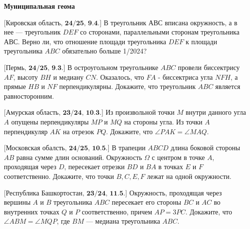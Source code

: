 \centerline{\bf \Huge Муниципальная геома}

$\bigl[\textbf{Кировская область, 24/25, 9.4.}\bigr]$
В треугольник $АВС$ вписана окружность, а в нее --- треугольник $DEF$ со сторонами, параллельными сторонам треугольника $АВС$. Верно ли, что отношение площади треугольника $D E F$ к площади треугольника $A B C$ обязательно больше 1/2024?

$\bigl[\textbf{Пермь, 24/25, 9.3.}\bigr]$
В остроугольном треугольнике $A B C$ провели биссектрису $A F$, высоту $B H$ и медиану $C N$. Оказалось, что $F A$ - биссектриса угла $N F H$, а прямые $H B$ и $N F$ перпендикулярны. Докажите, что треугольник $A B C$ является равносторонним.


$\bigl[\textbf{Амурская область, 23/24, 10.3.}\bigr]$
Из произвольной точки $M$ внутри данного угла $A$ опущены перпендикуляры $M P$ и $M Q$ на стороны угла. Из точки $A$ перпендикуляр $A K$ на отрезок $P Q$. Докажите, что $\angle P A K=\angle M A Q$.

$\bigl[\textbf{Московская обалсть, 24/25, 10.5.}\bigr]$
В трапеции $A B C D$ длина боковой стороны $A B$ равна сумме длин оснований. Окружность $\Omega$ с центром в точке $A$, проходящая через $D$, пересекает отрезки $B D$ и $B A$ в точках $E$ и $F$ соответственно. Докажите, что точки $B, C, E, F$ лежат на одной окружности.

$\bigl[\textbf{Республика Башкортостан, 23/24, 11.5.}\bigr]$
Окружность, проходящая через вершины $A$ и $B$ треугольника $A B C$ пересекает его стороны $B C$ и $A C$ во внутренних точках $Q$ и $P$ соответственно, причем $A P=3 P C$. Докажите, что $\angle A B M=\angle M Q P$, где $B M$ --- медиана треугольника $A B C$.

